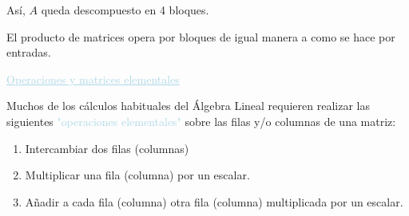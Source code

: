 \documentclass[12pt]{article}
\begin{document}
Así, $A$ queda descompuesto en 4 bloques.


El producto de matrices opera por bloques de igual manera a como
se hace por entradas.

\textcolor{lightblue}{\underline{Operaciones y matrices
elementales}}

Muchos de los cálculos habituales del Álgebra Lineal requieren
realizar las siguientes \textcolor{lightblue}{"operaciones
elementales"} sobre las filas y/o columnas de una matriz:

\begin{enumerate}
    \item Intercambiar dos filas (columnas)
    \item Multiplicar una fila (columna) por un escalar.
\item Añadir a cada fila (columna) otra fila (columna)
multiplicada por un escalar.
\end{enumerate}
\end{document}
